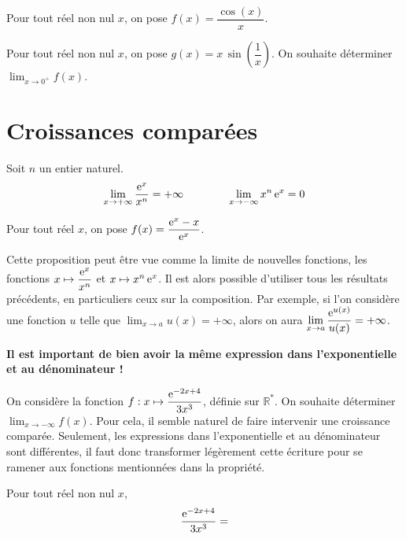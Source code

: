 \documentclass[11pt,fleqn, openany]{book} %
\begin{document}
\begin{example}Pour tout réel non nul $x$, on pose $f(x)=\dfrac{\cos(x)}{x}$.

 \vskip50pt
 \end{example}
 
\begin{example}Pour tout réel non nul $x$, on pose $g(x)=x\,\sin\left(\dfrac{1}{x}\right)$. On souhaite déterminer $\displaystyle\lim_{x \to 0^+}f(x)$.

\vskip50pt
\end{example}


\section{Croissances comparées}

\begin{proposition} Soit $n$ un entier naturel.
\[\displaystyle \lim_{x \to +\infty} \dfrac{\mathrm{e}^x}{x^n}=+\infty \qquad \qquad \displaystyle \lim_{x \to -\infty} x^n\,\mathrm{e}^x =0\]

\vspace{-0.5cm}\end{proposition}


\begin{example} Pour tout réel $x$, on pose $f(x)=\dfrac{\mathrm{e}^x-x}{\mathrm{e}^x}$.
\vskip40pt
\end{example}

Cette proposition peut être vue comme la limite de nouvelles fonctions, les fonctions $x\mapsto \dfrac{\mathrm{e}^x}{x^n}$ et $x\mapsto x^n\,\mathrm{e}^x$. Il est alors possible d'utiliser tous les résultats précédents, en particuliers ceux sur la composition. Par exemple, si l'on considère une fonction $u$ telle que $\displaystyle\lim_{x \to a}u(x)=+\infty$, alors on aura $\displaystyle\lim_{x \to a}\dfrac{\mathrm{e}^{u(x)}}{u(x)}=+\infty$.

\textbf{Il est important de bien avoir la même expression dans l'exponentielle et au dénominateur !}

\begin{example}On considère la fonction $f : x\mapsto \dfrac{\mathrm{e}^{-2x+4}}{3x^3}$, définie sur $\mathbb{R}^*$. On souhaite déterminer $\displaystyle\lim_{x \to -\infty}f(x)$. Pour cela, il semble naturel de faire intervenir une croissance comparée. Seulement, les expressions dans l'exponentielle et au dénominateur sont différentes, il faut donc transformer légèrement cette écriture pour se ramener aux fonctions mentionnées dans la propriété.

Pour tout réel non nul $x$, 
\[\dfrac{\mathrm{e}^{-2x+4}}{3x^3} = \]

\vskip40pt
\end{example}
\end{document}
